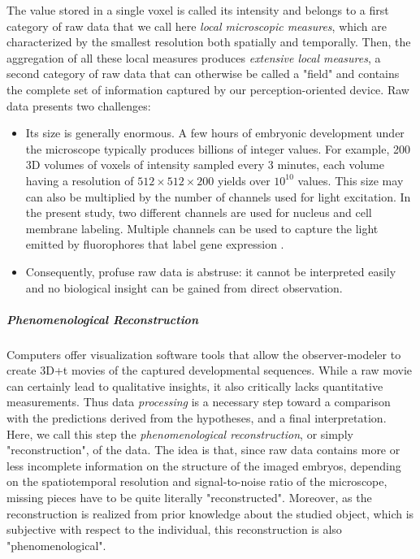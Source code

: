 The value stored in a single voxel is called its intensity and belongs to a first category of raw data that we call here \textit{local microscopic measures}, which are characterized by the smallest resolution both spatially and temporally. Then, the aggregation of all these local measures produces \textit{extensive local measures}, a second category of raw data that can otherwise be called a "field" and contains the complete set of information captured by our perception-oriented device. Raw data presents two challenges:
\begin{itemize}
	\item Its size is generally enormous. A few hours of embryonic development under the microscope typically produces billions of integer values. For example, 200 3D volumes of voxels of intensity sampled every 3 minutes, each volume having a resolution of $512 \times 512 \times 200$ yields over $10^{10}$ values. This size may can also be multiplied by the number of channels used for light excitation. In the present study, two different channels are used for nucleus and cell membrane labeling. Multiple channels can be used to capture the light emitted by fluorophores that label gene expression \cite{Ducros:2011km}.
	\item Consequently, profuse raw data is abstruse: it cannot be interpreted easily and no biological insight can be gained from direct observation.
\end{itemize}

\subparagraph{Phenomenological Reconstruction }


Computers offer visualization software tools that allow the observer-modeler to create 3D+t movies of the captured developmental sequences. While a raw movie can certainly lead to qualitative insights, it also critically lacks quantitative measurements. Thus data \textit{processing} is a necessary step toward a comparison with the predictions derived from the hypotheses, and a final interpretation. Here, we call this step the \textit{phenomenological reconstruction}, or simply "reconstruction", of the data. The idea is that, since raw data contains more or less incomplete information on the structure of the imaged embryos, depending on the spatiotemporal resolution and signal-to-noise ratio of the microscope, missing pieces have to be quite literally "reconstructed". Moreover, as the reconstruction is realized from prior knowledge about the studied object, which is subjective with respect to the individual, this reconstruction is also "phenomenological".

